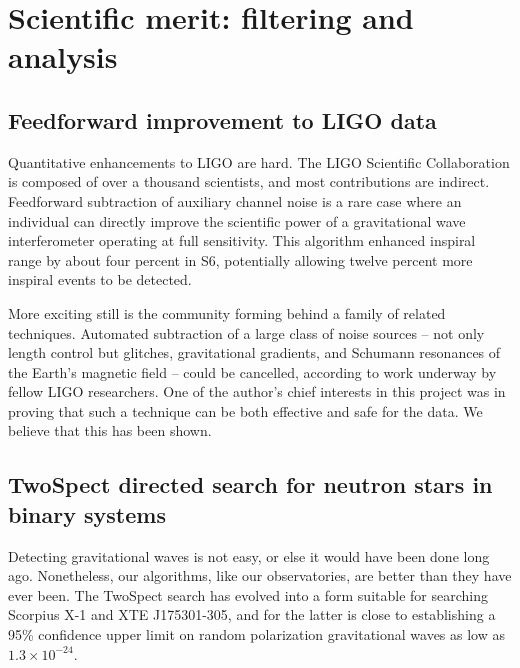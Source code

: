     \section{Scientific merit: filtering and analysis}
    \label{merit}


        \subsection{Feedforward improvement to LIGO data}
        \label{feedforward_end}

Quantitative enhancements to LIGO are hard.
The LIGO Scientific Collaboration is composed of over a thousand scientists, and most contributions are indirect.
Feedforward subtraction of auxiliary channel noise is a rare case where an individual can directly improve the scientific power of a gravitational wave interferometer operating at full sensitivity.
This algorithm enhanced inspiral range by about four percent in S6, potentially allowing twelve percent more inspiral events to be detected.

More exciting still is the community forming behind a family of related techniques.
Automated subtraction of a large class of noise sources -- not only length control but glitches, gravitational gradients, and Schumann resonances of the Earth's magnetic field -- could be cancelled, according to work underway by fellow LIGO researchers.
One of the author's chief interests in this project was in proving that such a technique can be both effective and safe for the data.
We believe that this has been shown.

        \subsection{TwoSpect directed search for neutron stars in binary systems}
        \label{TwoSpect_end}




Detecting gravitational waves is not easy, or else it would have been done long ago.
Nonetheless, our algorithms, like our observatories, are better than they have ever been.
The TwoSpect search has evolved into a form suitable for searching Scorpius X-1 and XTE J175301-305, and for the latter is close to establishing a 95\% confidence upper limit on random polarization gravitational waves as low as $1.3\times10^{-24}$. 

